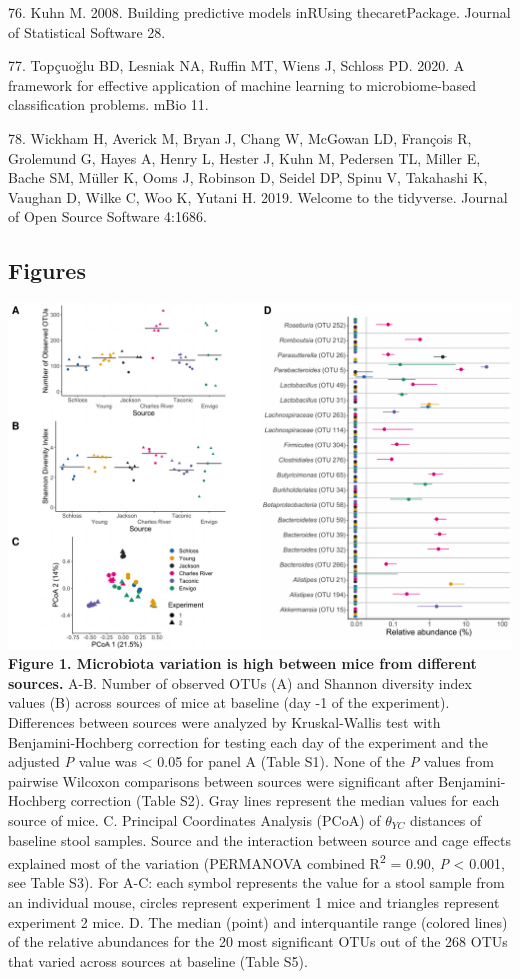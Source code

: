 \documentclass[
  11pt,
]{article}
\begin{document}
\leavevmode\hypertarget{ref-Kuhn2008}{}%
76. Kuhn M. 2008. Building predictive models inRUsing thecaretPackage.
Journal of Statistical Software 28.

\leavevmode\hypertarget{ref-Topcuoglu2020}{}%
77. Topçuoğlu BD, Lesniak NA, Ruffin MT, Wiens J, Schloss PD. 2020. A
framework for effective application of machine learning to
microbiome-based classification problems. mBio 11.

\leavevmode\hypertarget{ref-Tidyverse2019}{}%
78. Wickham H, Averick M, Bryan J, Chang W, McGowan LD, François R,
Grolemund G, Hayes A, Henry L, Hester J, Kuhn M, Pedersen TL, Miller E,
Bache SM, Müller K, Ooms J, Robinson D, Seidel DP, Spinu V, Takahashi K,
Vaughan D, Wilke C, Woo K, Yutani H. 2019. Welcome to the tidyverse.
Journal of Open Source Software 4:1686.

\newpage

\hypertarget{figures}{%
\subsection{Figures}\label{figures}}

\includegraphics{figure_1.pdf} \textbf{Figure 1. Microbiota variation is
high between mice from different sources.} A-B. Number of observed OTUs
(A) and Shannon diversity index values (B) across sources of mice at
baseline (day -1 of the experiment). Differences between sources were
analyzed by Kruskal-Wallis test with Benjamini-Hochberg correction for
testing each day of the experiment and the adjusted \emph{P} value was
\textless{} 0.05 for panel A (Table S1). None of the \emph{P} values
from pairwise Wilcoxon comparisons between sources were significant
after Benjamini-Hochberg correction (Table S2). Gray lines represent the
median values for each source of mice. C. Principal Coordinates Analysis
(PCoA) of \(\theta_{YC}\) distances of baseline stool samples. Source
and the interaction between source and cage effects explained most of
the variation (PERMANOVA combined R\textsuperscript{2} = 0.90, \emph{P}
\textless{} 0.001, see Table S3). For A-C: each symbol represents the
value for a stool sample from an individual mouse, circles represent
experiment 1 mice and triangles represent experiment 2 mice. D. The
median (point) and interquantile range (colored lines) of the relative
abundances for the 20 most significant OTUs out of the 268 OTUs that
varied across sources at baseline (Table S5).
\end{document}
